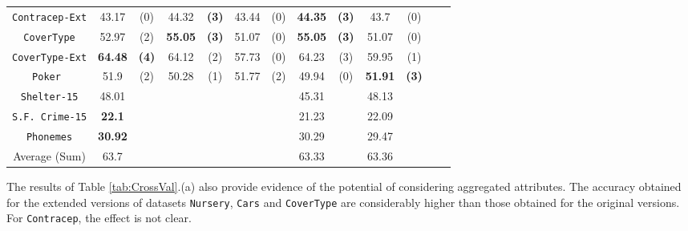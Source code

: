\begin{table*}[t]
\begin{tabular}{c|cc|cc|cc|cc|cc|cc}
{\tt Contracep-Ext} & 43.17    & (0)    & 44.32    &{\bf(3)}& 43.44    & (0)    &{\bf44.35}&{\bf(3)}& 43.7     & (0)    &          &        \\
{\tt CoverType}     & 52.97    & (2)    &{\bf55.05}&{\bf(3)}& 51.07    & (0)    &{\bf55.05}&{\bf(3)}& 51.07    & (0)    &          &        \\
{\tt CoverType-Ext} &{\bf64.48}&{\bf(4)}& 64.12    & (2)    & 57.73    & (0)    & 64.23    & (3)    & 59.95    & (1)    &          &        \\ 
{\tt Poker }        & 51.9     & (2)    & 50.28    & (1)    & 51.77    & (2)    & 49.94    & (0)    &{\bf51.91}&{\bf(3)}&          &        \\ 
{\tt Shelter-15}    & 48.01    &        &          &        &          &        & 45.31    &        & 48.13    &        &          &        \\   
{\tt S.F. Crime-15} &{\bf22.1} &        &          &        &          &        & 21.23    &        & 22.09    &        &          &        \\ 
{\tt Phonemes}      &{\bf30.92}&        &          &        &          &        & 30.29    &        & 29.47    &        &          &        \\
\hline
Average (Sum)       &     63.7 &        &          &        &          &        & 63.33    &        & 63.36    &        &          & 

\end{tabular}
\label{exp:thirdset}
\normalsize
\end{table*}


The results of  Table \ref{tab:CrossVal}.(a) also
provide evidence of  the potential
of considering aggregated attributes. 
The accuracy obtained for the extended versions of datasets
{\tt Nursery}, {\tt Cars} and {\tt CoverType} are considerably higher than those obtained for 
the original versions. For {\tt Contracep}, the effect is not clear.

